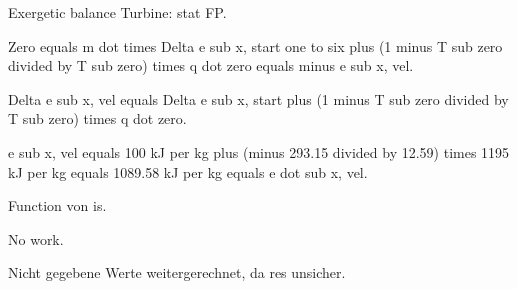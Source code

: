 Exergetic balance Turbine: stat FP.

Zero equals m dot times Delta e sub x, start one to six plus (1 minus T sub zero divided by T sub zero) times q dot zero equals minus e sub x, vel.

Delta e sub x, vel equals Delta e sub x, start plus (1 minus T sub zero divided by T sub zero) times q dot zero.

e sub x, vel equals 100 kJ per kg plus (minus 293.15 divided by 12.59) times 1195 kJ per kg equals 1089.58 kJ per kg equals e dot sub x, vel. 

Function von is.

No work.

Nicht gegebene Werte weitergerechnet, da res unsicher.